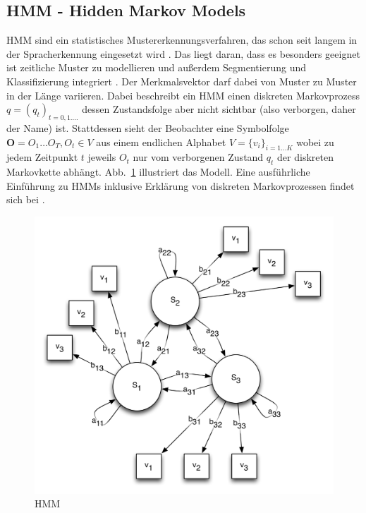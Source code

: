 \subsection[HMM]{HMM - Hidden Markov Models} \label{sub:hmm}

\ac{HMM} sind ein statistisches Mustererkennungsverfahren, das schon seit langem in der Spracherkennung eingesetzt wird \cite{Rabiner:1989p11574}. Das liegt daran, dass es besonders geeignet ist zeitliche Muster zu modellieren und außerdem Segmentierung und Klassifizierung integriert \cite{Kosmala:1998p11691}. Der Merkmalsvektor darf dabei von Muster zu Muster in der Länge variieren.
Dabei beschreibt ein HMM einen diskreten Markovprozess $q=(q_t)_{t=0,1.\dots}$ dessen Zustandsfolge aber nicht sichtbar (also verborgen, daher der Name) ist. Stattdessen sieht der Beobachter eine Symbolfolge $\mathbf{O}=O_1\dots O_T, O_t\in V$ aus einem endlichen Alphabet $V=\{v_i\}_{i=1\dots K}$ wobei zu jedem Zeitpunkt $t$ jeweils $O_t$ nur vom verborgenen Zustand $q_t$ der diskreten Markovkette abhängt. Abb.~\ref{fig:hmm} illustriert das Modell. Eine ausführliche Einführung zu HMMs inklusive Erklärung von diskreten Markovprozessen findet sich bei \citet{Rabiner:1989p11574}.

\begin{figure}[htbp]
  \centering \includegraphics[width=\textwidth]{figures/hmm.png}
  \caption{HMM}
  \label{fig:hmm}
\end{figure}

